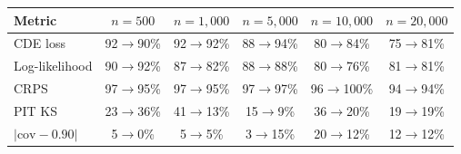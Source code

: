 \begin{tabular}{lccccc}
\toprule
Metric & $n=500$ & $n=1,000$ & $n=5,000$ & $n=10,000$ & $n=20,000$ \\
\midrule
CDE loss & 92$\to$90\% & 92$\to$92\% & 88$\to$94\% & 80$\to$84\% & 75$\to$81\% \\
Log-likelihood & 90$\to$92\% & 87$\to$82\% & 88$\to$88\% & 80$\to$76\% & 81$\to$81\% \\
CRPS & 97$\to$95\% & 97$\to$95\% & 97$\to$97\% & 96$\to$100\% & 94$\to$94\% \\
PIT KS & 23$\to$36\% & 41$\to$13\% & 15$\to$9\% & 36$\to$20\% & 19$\to$19\% \\
$|\mathrm{cov}-0.90|$ & 5$\to$0\% & 5$\to$5\% & 3$\to$15\% & 20$\to$12\% & 12$\to$12\% \\
\bottomrule
\end{tabular}